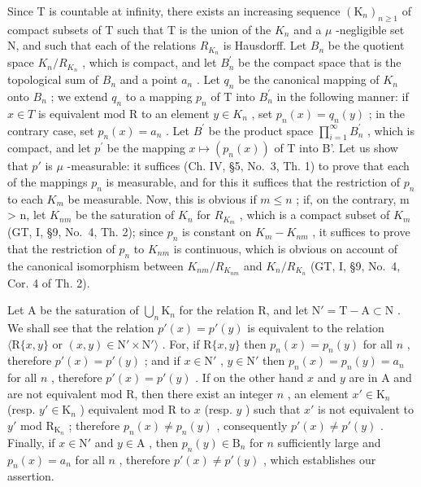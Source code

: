 Since T is countable at infinity, there exists an increasing sequence \((\mathrm{K}_{n})_{n\geqslant1}\) of compact subsets of T such that T is the union of the \(K_{n}\) and a \(\mu\) -negligible set N, and such that each of the relations \(R_{K_{n}}\) is Hausdorff. Let \(B_{n}\) be the quotient space \(K_{n}/R_{K_{n}}\) , which is compact, and let \(B_{n}^{\prime}\) be the compact space that is the topological sum of \(B_{n}\) and a point \(a_{n}\) . Let \(q_{n}\) be the canonical mapping of \(K_{n}\) onto \(B_{n}\) ; we extend \(q_{n}\) to a mapping \(p_{n}\) of T into \(B_{n}^{\prime}\) in the following manner: if \(x\in T\) is equivalent mod R to an element \(y\in K_{n}\) , set \(p_{n}(x)=q_{n}(y)\) ; in the contrary case, set \(p_{n}(x)=a_{n}\) . Let \(B^{\prime}\) be the product space \(\prod_{i=1}^{\infty}B_{n}^{\prime}\) , which is compact, and let \(p^{\prime}\) be the mapping \(x \mapsto (p_n(x))\) of T into B'. Let us show that \(p'\) is \(\mu\) -measurable: it suffices (Ch. IV, §5, No.~3, Th. 1) to prove that each of the mappings \(p_n\) is measurable, and for this it suffices that the restriction of \(p_n\) to each \(K_m\) be measurable. Now, this is obvious if \(m \leqslant n\) ; if, on the contrary, m \textgreater{} n, let \(K_{nm}\) be the saturation of \(K_n\) for \(R_{K_m}\) , which is a compact subset of \(K_m\) (GT, I, §9, No.~4, Th. 2); since \(p_n\) is constant on \(K_m - K_{nm}\) , it suffices to prove that the restriction of \(p_n\) to \(K_{nm}\) is continuous, which is obvious on account of the canonical isomorphism between \(K_{nm}/R_{K_{nm}}\) and \(K_n/R_{K_n}\) (GT, I, §9, No.~4, Cor. 4 of Th. 2).

Let A be the saturation of \(\bigcup_{n} \mathrm{K}_{n}\) for the relation R, and let \(\mathrm{N}' = \mathrm{T} - \mathrm{A} \subset \mathrm{N}\) . We shall see that the relation \(p'(x) = p'(y)\) is equivalent to the relation \(\langle \mathrm{R}\{x, y\}\) or \((x, y) \in \mathrm{N}' \times \mathrm{N}' \rangle\) . For, if \(\mathrm{R}\{x, y\}\) then \(p_n(x) = p_n(y)\) for all \(n\) , therefore \(p'(x) = p'(y)\) ; and if \(x \in \mathrm{N}'\) , \(y \in \mathrm{N}'\) then \(p_n(x) = p_n(y) = a_n\) for all \(n\) , therefore \(p'(x) = p'(y)\) . If on the other hand \(x\) and \(y\) are in A and are not equivalent mod R, then there exist an integer \(n\) , an element \(x' \in \mathrm{K}_n\) (resp. \(y' \in \mathrm{K}_n\) ) equivalent mod R to \(x\) (resp. \(y\) ) such that \(x'\) is not equivalent to \(y'\) mod \(\mathrm{R}_{\mathrm{K}_n}\) ; therefore \(p_n(x) \neq p_n(y)\) , consequently \(p'(x) \neq p'(y)\) . Finally, if \(x \in \mathrm{N}'\) and \(y \in \mathrm{A}\) , then \(p_n(y) \in \mathrm{B}_n\) for \(n\) sufficiently large and \(p_n(x) = a_n\) for all \(n\) , therefore \(p'(x) \neq p'(y)\) , which establishes our assertion.

